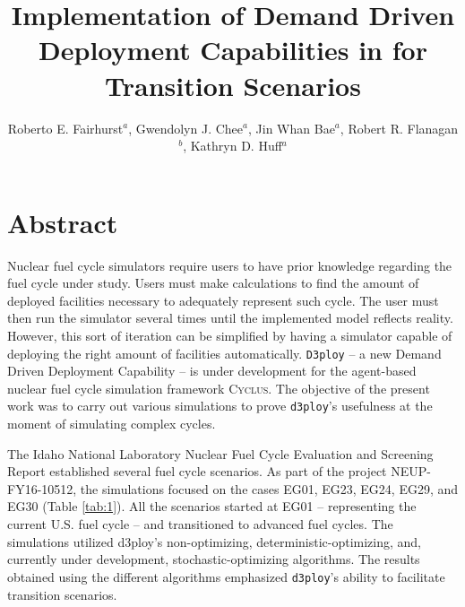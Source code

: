 \documentclass{anstrans}
\title{Implementation of Demand Driven Deployment Capabilities in \Cyclus for Transition Scenarios}
\author{Roberto E. Fairhurst$^a$, Gwendolyn J. Chee$^a$, Jin Whan Bae$^a$, Robert R. Flanagan$^b$, Kathryn D. Huff$^a$}
\institute{
$^a$University of Illinois at Urbana-Champaign, Dept. of Nuclear, Plasma, and Radiological Engineering\\
$^b$University of South Carolina, Nuclear Engineering Program\\
ref3@illinois.edu
}
\newcommand{\Cyclus}{\textsc{Cyclus}\xspace}%
\begin{document}
\section{Abstract}

Nuclear fuel cycle simulators require users to have prior knowledge regarding the fuel cycle under study.
Users must make calculations to find the amount of deployed facilities necessary to adequately represent such cycle.
The user must then run the simulator several times until the implemented model reflects reality.
However, this sort of iteration can be simplified by having a simulator capable of deploying the right
amount of facilities automatically.
\texttt{D3ploy} \cite{chee_demonstration_2019} -- a new Demand Driven Deployment Capability --
is under development for the agent-based nuclear fuel cycle simulation framework \Cyclus \cite{huff_fundamental_2016}.
The objective of the present work was to carry out various simulations to prove \texttt{d3ploy}'s usefulness at
the moment of simulating complex cycles.

The Idaho National Laboratory Nuclear Fuel Cycle Evaluation and Screening Report \cite{wigeland_nuclear_2014} established
several fuel cycle scenarios.
As part of the project NEUP-FY16-10512, the simulations focused on the cases EG01, EG23, EG24, EG29, and EG30 (Table \ref{tab:1}).
All the scenarios started at EG01 -- representing the current U.S. fuel cycle -- and transitioned to advanced fuel cycles.
The simulations utilized d3ploy's non-optimizing, deterministic-optimizing, and, currently under development,
stochastic-optimizing algorithms. The results obtained using the different algorithms emphasized \texttt{d3ploy}'s ability
to facilitate transition scenarios.
\end{document}
